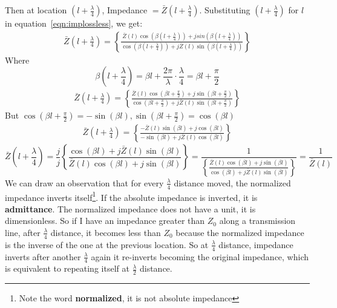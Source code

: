 Then at location ${(l+\frac{\lambda}{4})}$, Impedance $=\bar{Z}(l+\frac{\lambda}{4})$. Substituting ${(l+\frac{\lambda}{4})}$ for $l$ in equation~\ref{eqn:implossless}, we get:
\begin{align*}
\bar{Z}\left(l+\frac{\lambda}{4}\right) = \left\lbrace \frac{\bar{Z}(l)\cos(\beta (l+\frac{\lambda}{4})) + jsin(\beta (l+\frac{\lambda}{4}))}{\cos(\beta (l+\frac{\lambda}{4})) + j\bar{Z}(l)\sin(\beta (l+\frac{\lambda}{4}))}\right\rbrace 
\end{align*}
Where 
\begin{dmath*}
\beta(l + \frac{\lambda}{4})=\beta l + \frac{2\pi}{\lambda} \cdot \frac{\lambda}{4} = \beta l + \frac{\pi}{2}
\end{dmath*}
\begin{align*} 
\bar{Z}\left(l+\frac{\lambda}{4}\right) = \left\lbrace \frac{\bar{Z}(l)\cos(\beta l + \frac{\pi}{2}) + j\sin(\beta l + \frac{\pi}{2})}{\cos(\beta l + \frac{\pi}{2}) + j\bar{Z}(l)\sin(\beta l + \frac{\pi}{2})}\right\rbrace
\end{align*}
But $\cos(\beta l + \frac{\pi}{2})= -\sin(\beta l), \sin(\beta l+\frac{\pi}{2})=\cos(\beta l)$
\begin{align*} 
\bar{Z}\left(l+\frac{\lambda}{4}\right) = \left\lbrace \frac{-\bar{Z}(l)\sin(\beta l) + j\cos(\beta l)}{-\sin(\beta l) + j\bar{Z}(l) \cos(\beta l)}\right\rbrace
\end{align*}
\begin{dmath*}
\bar{Z}\left(l+\frac{\lambda}{4}\right) =\frac{j}{j} \left\lbrace \frac{\cos(\beta l) + j\bar{Z}(l)\sin(\beta l)}{\bar{Z}(l)\cos(\beta l) + j\sin(\beta l)}\right\rbrace 
= \frac{1}{\left\lbrace \frac{\bar{Z}(l)\cos(\beta l) + j\sin(\beta l)}{\cos(\beta l) + j\bar{Z}(l)\sin(\beta l)}\right\rbrace} 
=\frac{1}{\bar{Z}(l)}
\end{dmath*}
We can draw an observation that for every $\frac{\lambda}{4}$ distance moved, the normalized impedance inverts itself\footnote{Note the word \textbf{normalized}, it is not absolute impedance}. If the absolute impedance is inverted, it is \textbf{admittance}. The normalized impedance does not have a unit, it is dimensionless. So if I have an impedance greater than $Z_0$ along a transmission line, after $\frac{\lambda}{4}$ distance, it becomes less than $Z_0$ because the normalized impedance is the inverse of the one at the previous location. So at $\frac{\lambda}{4}$ distance, impedance inverts after another $\frac{\lambda}{4}$ again it re-inverts becoming the original impedance, which is equivalent to repeating itself at $\frac{\lambda}{2}$ distance. 

